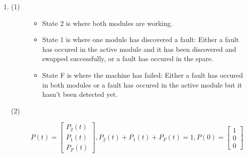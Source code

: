 \documentclass[a4paper,12pt]{article}
\begin{document}
\begin{enumerate}
        \item
            \begin{description}
                \item[(1)]
                    \begin{itemize}
                        \item State 2 is where both modules are working.
                        \item State 1 is where one module has discovered a fault: Either a fault has occured in the active module and it has been discovered and swapped successfully, or a fault has occured in the spare.
                        \item State F is where the machine has failed: Either a fault has occured in both modules or a fault has occured in the active module but it hasn't been detected yet.
                    \end{itemize}

                    \begin{center}
                    \end{center}

                \item[(2)] $P(t) = \begin{bmatrix} P_2(t) \\ P_1(t) \\ P_F(t) \end{bmatrix}, P_2(t) + P_1(t) + P_F(t) = 1, P(0) = \begin{bmatrix} 1 \\ 0 \\ 0 \end{bmatrix}$


\end{description}
\end{enumerate}
\end{document}
